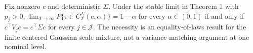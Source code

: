Fix nonzero \(c\) and deterministic \(\Sigma\). Under the stable limit in Theorem 1 with \(p_j>0\), \(\lim_{T\to\infty}P\{\tau\in C_T^{\Sigma}(c,\alpha)\}=1-\alpha\) for every \(\alpha\in(0,1)\) if and only if \(c^\top V_jc=c^\top\Sigma c\) for every \(j\in\mathcal J\). The necessity is an equality-of-laws result for the finite centered Gaussian scale mixture, not a variance-matching argument at one nominal level.